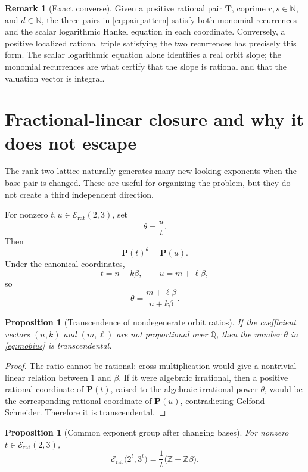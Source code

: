 \documentclass[11pt]{article}
\numberwithin{equation}{section}
\newtheorem{proposition}[theorem]{Proposition}
\theoremstyle{definition}
\newtheorem{remark}[theorem]{Remark}
\newcommand{\Q}{\mathbb{Q}}
\newcommand{\Z}{\mathbb{Z}}
\newcommand{\N}{\mathbb{N}}
\newcommand{\Pair}{\mathbf P}
\newcommand{\Erat}{\mathcal E_{\mathrm{rat}}}
\begin{document}
\begin{remark}[Exact converse]
Given a positive rational pair \(\mathbf T\), coprime \(r,s\in\N\), and \(d\in\N\), the three pairs in \eqref{eq:pairpattern} satisfy both monomial recurrences and the scalar logarithmic Hankel equation in each coordinate. Conversely, a positive localized rational triple satisfying the two recurrences has precisely this form. The scalar logarithmic equation alone identifies a real orbit slope; the monomial recurrences are what certify that the slope is rational and that the valuation vector is integral.
\end{remark}

\section{Fractional-linear closure and why it does not escape}

The rank-two lattice naturally generates many new-looking exponents when the base pair is changed. These are useful for organizing the problem, but they do not create a third independent direction.

For nonzero \(t,u\in\Erat(2,3)\), set
\[
       \theta=\frac{u}{t}.
\]
Then
\[
       \Pair(t)^\theta=\Pair(u).
\]
Under the canonical coordinates,
\[
 t=n+k\beta,
 \qquad
 u=m+\ell\beta,
\]
so
\begin{equation}\label{eq:mobius}
       \theta=\frac{m+\ell\beta}{n+k\beta}.
\end{equation}

\begin{proposition}[Transcendence of nondegenerate orbit ratios]\label{prop:mobtrans}
If the coefficient vectors \((n,k)\) and \((m,\ell)\) are not proportional over \(\Q\), then the number \(\theta\) in \eqref{eq:mobius} is transcendental.
\end{proposition}

\begin{proof}
The ratio cannot be rational: cross multiplication would give a nontrivial linear relation between \(1\) and \(\beta\). If it were algebraic irrational, then a positive rational coordinate of \(\Pair(t)\), raised to the algebraic irrational power \(\theta\), would be the corresponding rational coordinate of \(\Pair(u)\), contradicting Gelfond--Schneider. Therefore it is transcendental.
\end{proof}

\begin{proposition}[Common exponent group after changing bases]\label{prop:changedbasegroup}
For nonzero \(t\in\Erat(2,3)\),
\begin{equation}\label{eq:changedbase}
  \Erat\bigl(2^t,3^t\bigr)
   =\frac{1}{t}\bigl(\Z+\Z\beta\bigr).
\end{equation}
\end{proposition}
\end{document}
